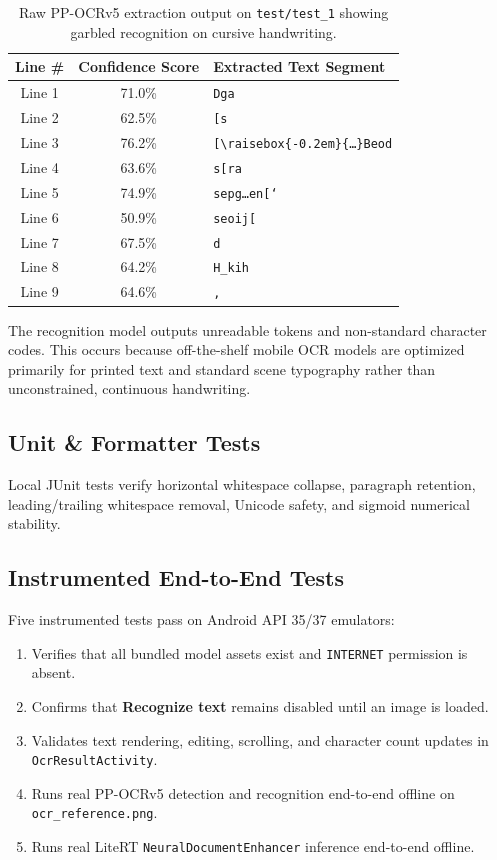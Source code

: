 \documentclass[11pt,a4paper]{article}
\begin{document}
\begin{table}[h]
\centering
\small
\begin{tabular}{ccl}
\toprule
\textbf{Line \#} & \textbf{Confidence Score} & \textbf{Extracted Text Segment} \\
\midrule
Line 1 & 71.0\% & \texttt{Dga} \\
Line 2 & 62.5\% & \texttt{[s} \\
Line 3 & 76.2\% & \texttt{[\textbackslash{}raisebox\{-0.2em\}\{\dots\}Beod} \\
Line 4 & 63.6\% & \texttt{s[ra} \\
Line 5 & 74.9\% & \texttt{sepg\dots{}en[`} \\
Line 6 & 50.9\% & \texttt{seoij[} \\
Line 7 & 67.5\% & \texttt{d} \\
Line 8 & 64.2\% & \texttt{H\_kih} \\
Line 9 & 64.6\% & \texttt{,} \\
\bottomrule
\end{tabular}
\caption{Raw PP-OCRv5 extraction output on \texttt{test/test\_1} showing garbled recognition on cursive handwriting.}
\label{tab:ocr_results}
\end{table}

The recognition model outputs unreadable tokens and non-standard character codes. This occurs because off-the-shelf mobile OCR models are optimized primarily for printed text and standard scene typography rather than unconstrained, continuous handwriting.

\subsection{Unit \& Formatter Tests}
Local JUnit tests verify horizontal whitespace collapse, paragraph retention, leading/trailing whitespace removal, Unicode safety, and sigmoid numerical stability.

\subsection{Instrumented End-to-End Tests}
Five instrumented tests pass on Android API 35/37 emulators:
\begin{enumerate}[leftmargin=*]
  \item Verifies that all bundled model assets exist and \texttt{INTERNET} permission is absent.
  \item Confirms that \textbf{Recognize text} remains disabled until an image is loaded.
  \item Validates text rendering, editing, scrolling, and character count updates in \texttt{OcrResultActivity}.
  \item Runs real PP-OCRv5 detection and recognition end-to-end offline on \texttt{ocr\_reference.png}.
  \item Runs real LiteRT \texttt{NeuralDocumentEnhancer} inference end-to-end offline.
\end{enumerate}
\end{document}
